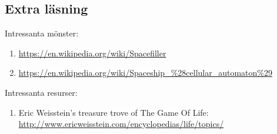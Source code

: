 \subsection{Extra läsning}

Intressanta mönster:

\begin{enumerate}
    \item \url{https://en.wikipedia.org/wiki/Spacefiller}
    \item \url{https://en.wikipedia.org/wiki/Spaceship_\%28cellular_automaton\%29}
\end{enumerate}

Intressanta resurser:

\begin{enumerate}
    \item Eric Weisstein's treasure trove of The Game Of Life: \url{http://www.ericweisstein.com/encyclopedias/life/topics/}
\end{enumerate}










